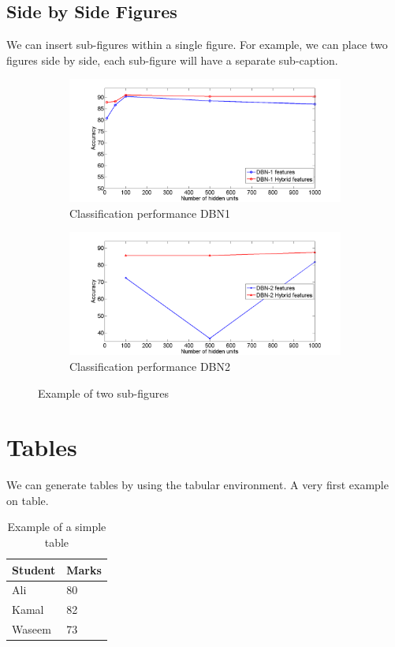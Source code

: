 \documentclass[12pt]{article}
\begin{document}
\subsection{Side by Side Figures}
We can insert sub-figures within a single figure. For example, we can place two figures side by side, each sub-figure will have a separate sub-caption.
\begin{figure}[!htp]
\centering
	\begin{subfigure}[b]{0.4\textwidth}
	\includegraphics[width=\textwidth]{dbn1_hidden.png}
	\caption{Classification performance DBN1}
	\label{fig:dbn1_hidden} 
	\end{subfigure}
	\qquad \qquad
	\begin{subfigure}[b]{0.4\textwidth}
	\includegraphics[width=\textwidth]{dbn2_hidden.png}
	\caption{Classification performance DBN2}
	\label{fig:dbn2_hidden} 
	\end{subfigure} 
\caption{Example of two sub-figures}
\end{figure}
\section{Tables}
We can generate tables by using the tabular environment. A very first example on table.
\begin{table}[h!]
\centering
\caption{Example of a simple table}
\begin{tabular}{|l|l|}
\hline
Student & Marks \\ \hline
Ali & 80 \\
Kamal & 82 \\
Waseem & 73 \\ \hline
\end{tabular}
\end{table}
\end{document}
